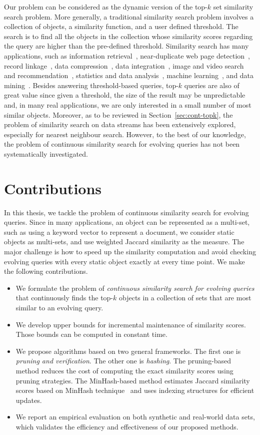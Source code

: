 Our problem can be considered as the dynamic version of the top-$k$ set similarity search problem. More generally, a traditional similarity search problem involves a collection of objects, a similarity function, and a user defined threshold. The search is to find all the objects in the collection whose similarity scores regarding the query are higher than the pre-defined threshold. Similarity search has many applications, such as information retrieval~\cite{SMG83,GG91,FO95}, near-duplicate web page detection~\cite{H06}, record linkage~\cite{W99}, data compression~\cite{GG91}, data integration~\cite{C98}, image and video search and recommendation~\cite{FBFNPE94,FSNAHDGHLPSY95,PPS94,SJ97}, statistics and data analysis~\cite{DW82,KK95}, machine learning~\cite{CS93}, and data mining~\cite{HT95,BMS07}. Besides answering threshold-based queries, top-$k$ queries are also of great value since given a threshold, the size of the result may be unpredictable and, in many real applications, we are only interested in a small number of most similar objects. Moreover, as to be reviewed in Section~\ref{sec:cont-topk}, the problem of similarity search on data streams has been extensively explored, especially for nearest neighbour search.  However, to the best of our knowledge, the problem of continuous similarity search for evolving queries has not been systematically investigated. 

\section{Contributions}
In this thesis, we tackle the problem of continuous similarity search for evolving queries. Since in many applications, an object can be represented as a multi-set, such as using a keyword vector to represent a document, we consider static objects as multi-sets, and use weighted Jaccard similarity as the measure.  The major challenge is how to speed up the similarity computation and avoid checking evolving queries with every static object exactly at every time point. We make the following contributions.  

\begin{itemize}
\item We formulate the problem of \emph{continuous similarity search for evolving queries} that continuously finds the top-$k$ objects in a collection of sets that are most similar to an evolving query.
\item We develop upper bounds for incremental maintenance of similarity scores.  Those bounds can be computed in constant time.
\item We propose algorithms based on two general frameworks.  The first one is \emph{pruning and verification}.  The other one is \emph{hashing}. The pruning-based method reduces the cost of computing the exact similarity scores using pruning strategies. The MinHash-based method estimates Jaccard similarity scores based on MinHash technique~\cite{Broder97} and uses indexing structures for efficient updates.
\item We report an empirical evaluation on both synthetic and real-world data sets, which validates the efficiency and effectiveness of our proposed methods.
\end{itemize}
  

